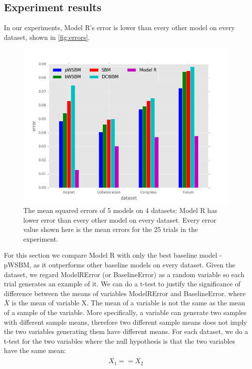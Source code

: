 \documentclass[letterpaper]{article}
\begin{document}
\subsection{Experiment results}
In our experiments,
Model R's error is lower than every other model on every dataset,
shown in \autoref{fig:errors}.
\begin{figure}[!htb]\centering
	\includegraphics[width=\textwidth]{link-weight-errors}
	\caption[content...]{
		The mean squared errors of 5 models on 4 datasets:
		Model R has lower error than every other model on every dataset.
		Every error value shown here is the mean errors for the 25 trials in the experiment.
	}
	\label{fig:errors}
\end{figure}
For this section we compare Model R with only the best baseline model - pWSBM, as it outperforms other baseline models on every dataset.
Given the dataset, we regard ModelRError (or BaselineError) as a random variable so each trial generates an example of it.
We can do a t-test to justify the significance of difference between the means of variables ModelRError and BaselineError.
where $ \overline{X} $ is the mean of variable X.
The mean of a variable is not the same as the mean of a sample of the variable.
More specifically,
a variable can generate two samples with different sample means,
therefore two different sample means does not imply the two variables generating them have different means.
For each dataset, we do a t-test for the two variables where the null hypothesis is that the two variables have the same mean:
\begin{align*}
\overline{X_1} == \overline{X_2}
\end{align*}
\end{document}
